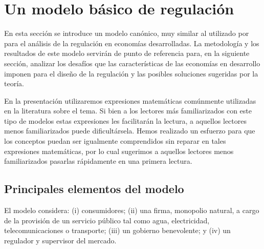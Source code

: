 \documentclass[
  12pt,
  spanish,
]{book}
\begin{document}
\hypertarget{modelo}{%
\section{Un modelo básico de regulación}\label{modelo}}

En esta sección se introduce un modelo canónico, muy similar al
utilizado por \citet{Laffont2005} para el análisis de la regulación en
economías desarrolladas. La metodología y los resultados de este modelo
servirán de punto de referencia para, en la siguiente sección, analizar
los desafíos que las características de las economías en desarrollo
imponen para el diseño de la regulación y las posibles soluciones
sugeridas por la teoría.

En la presentación utilizaremos expresiones matemáticas comúnmente
utilizadas en la literatura sobre el tema. Si bien a los lectores más
familiarizados con este tipo de modelos estas expresiones les
facilitarán la lectura, a aquellos lectores menos familiarizados puede
dificultársela. Hemos realizado un esfuerzo para que los conceptos
puedan ser igualmente comprendidos sin reparar en tales expresiones
matemáticas, por lo cual sugerimos a aquellos lectores menos
familiarizados pasarlas rápidamente en una primera lectura.

\hypertarget{principales-elementos-del-modelo}{%
\subsection{Principales elementos del
modelo}\label{principales-elementos-del-modelo}}

El modelo considera: (i) consumidores; (ii) una firma, monopolio
natural, a cargo de la provisión de un servicio público tal como agua,
electricidad, telecomunicaciones o transporte; (iii) un gobierno
benevolente; y (iv) un regulador y supervisor del mercado.
\end{document}
